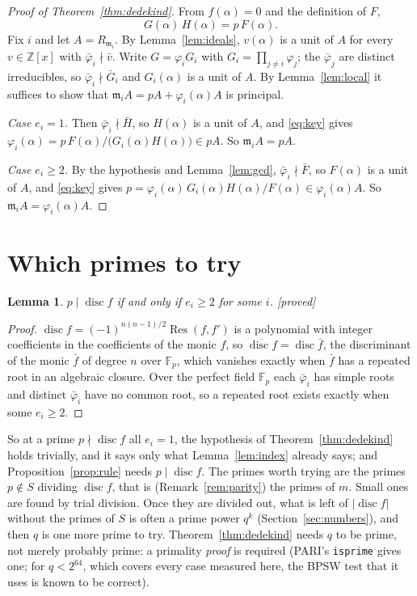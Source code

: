\documentclass[10pt,a4paper]{article}
\newcommand{\Fp}{\mathbb{F}_p}
\newcommand{\Z}{\mathbb{Z}}
\newcommand{\m}{\mathfrak{m}}
\DeclareMathOperator{\disc}{disc}
\DeclareMathOperator{\Res}{Res}
\newcommand{\code}[1]{\texttt{#1}}
\newcommand{\stproved}{\textsf{\small[proved]}\xspace}
\theoremstyle{plain}
\newtheorem{lemma}[proposition]{Lemma}
\theoremstyle{definition}
\begin{document}
\begin{proof}[Proof of Theorem~\ref{thm:dedekind}]
From $f(\alpha)=0$ and the definition of $F$,
\begin{equation}\label{eq:key}
G(\alpha)\,H(\alpha)=p\,F(\alpha).
\end{equation}
Fix $i$ and let $A=R_{\m_i}$.  By Lemma~\ref{lem:ideals}, $v(\alpha)$ is a unit of $A$ for every $v\in\Z[x]$ with
$\bar\varphi_i\nmid\bar v$.  Write $G=\varphi_iG_i$ with $G_i=\prod_{j\neq i}\varphi_j$; the $\bar\varphi_j$ are distinct
irreducibles, so $\bar\varphi_i\nmid\bar G_i$ and $G_i(\alpha)$ is a unit of $A$.  By Lemma~\ref{lem:local} it suffices to show that
$\m_iA=pA+\varphi_i(\alpha)A$ is principal.

\emph{Case $e_i=1$.}  Then $\bar\varphi_i\nmid\bar H$, so $H(\alpha)$ is a unit of $A$, and \eqref{eq:key} gives
$\varphi_i(\alpha)=p\,F(\alpha)\big/\big(G_i(\alpha)H(\alpha)\big)\in pA$.  So $\m_iA=pA$.

\emph{Case $e_i\geq2$.}  By the hypothesis and Lemma~\ref{lem:gcd}, $\bar\varphi_i\nmid\bar F$, so $F(\alpha)$ is a unit of $A$, and
\eqref{eq:key} gives $p=\varphi_i(\alpha)\,G_i(\alpha)H(\alpha)\big/F(\alpha)\in\varphi_i(\alpha)A$.  So $\m_iA=\varphi_i(\alpha)A$.
\end{proof}

\section{Which primes to try}\label{sec:primes}

\begin{lemma}\label{lem:discmodp}
$p\mid\disc f$ if and only if $e_i\geq2$ for some $i$.  \stproved
\end{lemma}

\begin{proof}
$\disc f=(-1)^{n(n-1)/2}\Res(f,f')$ is a polynomial with integer coefficients in the coefficients of the monic $f$, so
$\overline{\disc f}=\disc\bar f$, the discriminant of the monic $\bar f$ of degree $n$ over $\Fp$, which vanishes exactly when $\bar f$
has a repeated root in an algebraic closure.  Over the perfect field $\Fp$ each $\bar\varphi_i$ has simple roots and distinct
$\bar\varphi_i$ have no common root, so a repeated root exists exactly when some $e_i\geq2$.
\end{proof}

\noindent So at a prime $p\nmid\disc f$ all $e_i=1$, the hypothesis of Theorem~\ref{thm:dedekind} holds trivially, and it says only
what Lemma~\ref{lem:index} already says; and Proposition~\ref{prop:rule} needs $p\mid\disc f$.  The primes worth trying are the primes
$p\notin S$ dividing $\disc f$, that is (Remark~\ref{rem:parity}) the primes of $m$.  Small ones are found by trial division.  Once
they are divided out, what is left of $|\disc f|$ without the primes of $S$ is often a prime power $q^k$ (Section~\ref{sec:numbers}),
and then $q$ is one more prime to try.  Theorem~\ref{thm:dedekind} needs $q$ to be prime, not merely probably prime: a primality
\emph{proof} is required (PARI's \code{isprime} gives one; for $q<2^{64}$, which covers every case measured here, the BPSW test that it
uses is known to be correct).
\end{document}
